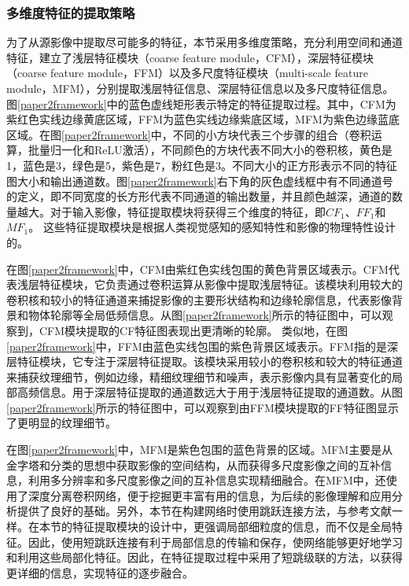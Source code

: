 \subsubsection{多维度特征的提取策略}\label{chapter3.2:Feature_extraction}
为了从源影像中提取尽可能多的特征，本节采用多维度策略，充分利用空间和通道特征，建立了浅层特征模块（coarse feature module，CFM），深层特征模块（coarse feature module，FFM）以及多尺度特征模块（multi-scale feature module，MFM），分别提取浅层特征信息、深层特征信息以及多尺度特征信息。图\ref{paper2framework}中的蓝色虚线矩形表示特定的特征提取过程。其中，CFM为紫红色实线边缘黄底区域，FFM为蓝色实线边缘紫底区域，MFM为紫色边缘蓝底区域。在图\ref{paper2framework}中，不同的小方块代表三个步骤的组合（卷积运算，批量归一化和ReLU激活），不同颜色的方块代表不同大小的卷积核，黄色是1，蓝色是3，绿色是5，紫色是7，粉红色是3。不同大小的正方形表示不同的特征图大小和输出通道数。图\ref{paper2framework}右下角的灰色虚线框中有不同通道号的定义，即不同宽度的长方形代表不同通道的输出数量，并且颜色越深，通道的数量越大。对于输入影像，特征提取模块将获得三个维度的特征，即$CF_1$、$FF_1$和$MF_1$。 这些特征提取模块是根据人类视觉感知的感知特性和影像的物理特性设计的。

在图\ref{paper2framework}中，CFM由紫红色实线包围的黄色背景区域表示。CFM代表浅层特征模块，它负责通过卷积运算从影像中提取浅层特征。该模块利用较大的卷积核和较小的特征通道来捕捉影像的主要形状结构和边缘轮廓信息，代表影像背景和物体轮廓等全局低频信息。从图\ref{paper2framework}所示的特征图中，可以观察到，CFM模块提取的CF特征图表现出更清晰的轮廓。
类似地，在图\ref{paper2framework}中，FFM由蓝色实线包围的紫色背景区域表示。FFM指的是深层特征模块，它专注于深层特征提取。该模块采用较小的卷积核和较大的特征通道来捕获纹理细节，例如边缘，精细纹理细节和噪声，表示影像内具有显著变化的局部高频信息。用于深层特征提取的通道数远大于用于浅层特征提取的通道数。从图\ref{paper2framework}所示的特征图中，可以观察到由FFM模块提取的FF特征图显示了更明显的纹理细节。

在图\ref{paper2framework}中，MFM是紫色包围的蓝色背景的区域。MFM主要是从金字塔和分类的思想中获取影像的空间结构，从而获得多尺度影像之间的互补信息，利用多分辨率和多尺度影像之间的互补信息实现精细融合。在MFM中，还使用了深度分离卷积网络，便于挖掘更丰富有用的信息，为后续的影像理解和应用分析提供了良好的基础。另外，本节在构建网络时使用跳跃连接方法，与参考文献\cite{he2016deep,huang2017densely}一样。在本节的特征提取模块的设计中，更强调局部细粒度的信息，而不仅是全局特征。因此，使用短跳跃连接有利于局部信息的传输和保存，使网络能够更好地学习和利用这些局部化特征。因此，在特征提取过程中采用了短跳级联的方法，以获得更详细的信息，实现特征的逐步融合。

